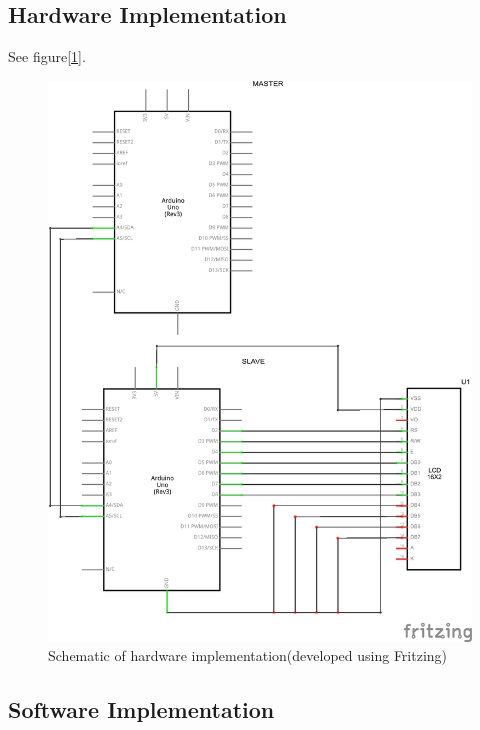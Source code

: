 \subsection{Hardware Implementation}
See figure[\ref{fig:schm}].\\
\begin{figure}
	\centering
	\includegraphics[width = \linewidth]{images/schem.png}
	\caption{Schematic of hardware implementation(developed using Fritzing)}
	\label{fig:schm}
\end{figure}

\subsection{Software Implementation}
